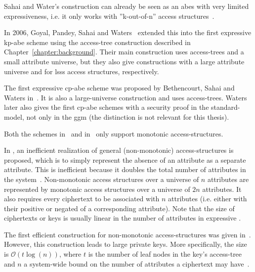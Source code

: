 Sahai and Water's construction can already be seen as an \acrshort{abes} with very limited expressiveness, i.e. it only works with ''k-out-of-n'' access structures~\cite{goyal_attribute-based_2006}.

In 2006, Goyal, Pandey, Sahai and Waters~\cite{goyal_attribute-based_2006} extended this into the first expressive \acrshort{kp-abe} scheme using the \gls{access-tree} construction described in Chapter~\ref{chapter:background}.
Their main construction uses \glspl{access-tree} and a small attribute universe, but they also give constructions with a large attribute universe and for \gls{lsss} access structures, respectively.

The first expressive \acrshort{cp-abe} scheme was proposed by Bethencourt, Sahai and Waters in~\cite{bethencourt_ciphertext-policy_2007}.
It is also a large-universe construction and uses \glspl{access-tree}.
Waters \cite{waters_ciphertext-policy_2011} later also gives the first \acrshort{cp-abe} schemes with a security proof in the \gls{standard-model}, not only in the \gls{ggm} (the distinction is not relevant for this thesis).

Both the schemes in~\cite{goyal_attribute-based_2006} and in~\cite{bethencourt_ciphertext-policy_2007} only support monotonic \glspl{access-structure}.

In \cite{goyal_attribute-based_2006}, an inefficient realization of general (non-monotonic) \glspl{access-structure} is proposed, which is to simply represent the absence of an attribute as a separate attribute.
This is inefficient because it doubles the total number of attributes in the system~\cite{goyal_attribute-based_2006}. 
Non-monotonic access structures over a universe of $n$ attributes are represented by monotonic access structures over a universe of $2n$ attributes.
It also requires every ciphertext to be associated with $n$ attributes (i.e. either with their positive or negated of a corresponding attribute).
Note that the size of ciphertexts or keys is usually linear in the number of attributes in expressive .

The first efficient construction for non-monotonic \glspl{access-structure} was given in~\cite{ostrovsky_attribute-based_2007}. 
However, this construction leads to large private keys.
More specifically, the size is $\mathcal{O}(t \log(n))$, where $t$ is the number of leaf nodes in the key's \gls{access-tree} and $n$ a system-wide bound on the number of attributes a ciphertext may have~\cite{lewko_revocation_2008}.

